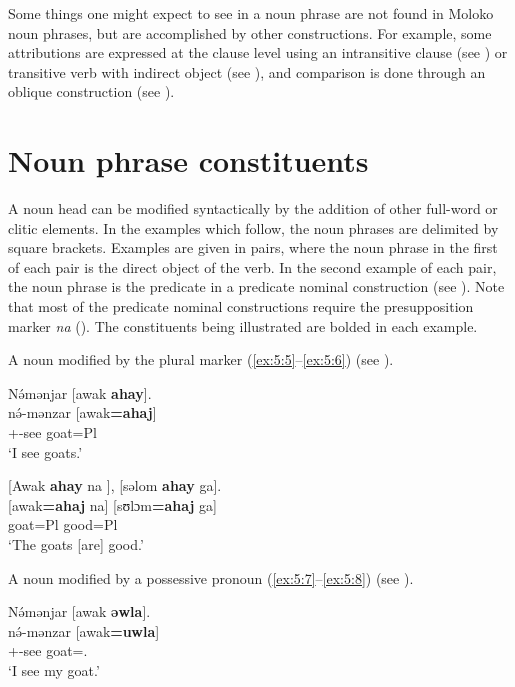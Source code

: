 Some things one might expect to see in a noun phrase are not found in Moloko noun phrases, but are accomplished by other constructions. For example, some attributions are expressed at the clause level using an intransitive clause (see ) or transitive verb with indirect object (see ), and comparison is done through an oblique construction (see ). 

\section{Noun phrase constituents}\label{sec:5.1}
\hypertarget{RefHeading1211581525720847}{}
A noun head can be modified syntactically by the addition of other full-word or clitic elements. In the examples which follow, the noun phrases are delimited by square brackets. Examples are given in pairs, where the noun phrase in the first of each pair is the direct object of the verb. In the second example of each pair, the noun phrase is the predicate in a predicate nominal construction (see ). Note that most of the predicate nominal constructions require the presupposition marker \textit{na } (). The constituents being illustrated are bolded in each example. 

A noun modified by the plural marker (\ref{ex:5:5}--\ref{ex:5:6}) (see ).

\ea \label{ex:5:5}
N\'{ə}mənjar  [awak \textbf{ahay}].\\
\gll  n\'{ə}-mənzar  [awak\textbf{=ahaj}]\\
      {\oneS}+{\IFV}-see  goat=Pl\\
\glt  ‘I see goats.’
\z

\ea \label{ex:5:6}
{}[Awak\textbf{  ahay}  na ],  [səlom  \textbf{ahay}  ga].\\
\gll  {}[awak\textbf{=ahaj}     na]   [sʊlɔm\textbf{=ahaj}   ga]\\
      goat=Pl  {\PSP}  good=Pl  {\ADJ}\\
\glt  ‘The goats [are] good.’
\z

A noun modified by a possessive pronoun (\ref{ex:5:7}--\ref{ex:5:8}) (see ).

\ea \label{ex:5:7}
N\'{ə}mənjar  [awak \textbf{əwla}].   \\
\gll  n\'{ə}-mənzar [awak\textbf{=uwla}]\\
      {\oneS}+{\IFV}-see  goat={\oneS}.{\POSS}\\
\glt  ‘I see my goat.’
\z

